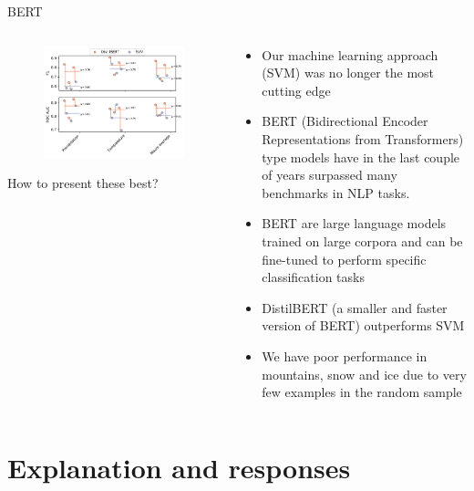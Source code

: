 \documentclass[9pt,aspectratio=169]{beamer}
\begin{document}
\begin{frame}{BERT}
\begin{columns}
\begin{column}{0.55\linewidth}
\begin{figure}
{				\includegraphics[width=\linewidth]{../figures/SI_figure_5.pdf}
			}
		\end{figure}
	
		How to present these best?
		
	\end{column}
	\begin{column}{0.45\linewidth}
		\begin{itemize}
			\item Our machine learning approach (SVM) was no longer the most cutting edge 
			\item BERT (Bidirectional Encoder Representations from Transformers) type models have in the last couple of years surpassed many benchmarks in NLP tasks.
			\item BERT are large language models trained on large corpora and can be fine-tuned to perform specific classification tasks
			\item DistilBERT (a smaller and faster version of BERT) outperforms SVM
			\item We have poor performance in mountains, snow and ice due to very few examples in the random sample
		\end{itemize}
	\end{column}
\end{columns}
\end{frame}

\section{Explanation and responses}
\end{document}
